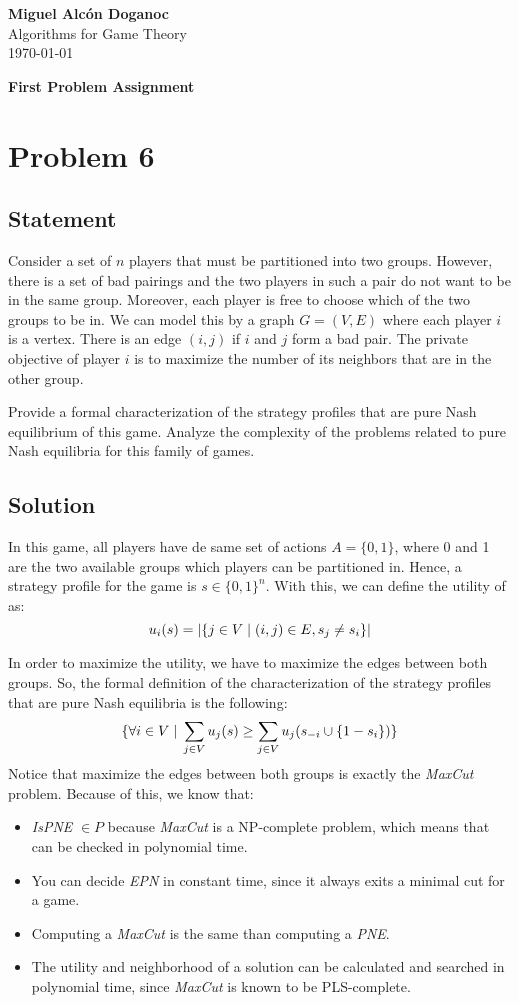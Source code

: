 \documentclass[a4paper, 11pt]{article}
\newcommand{\onemm}[0]{\hspace{1mm}}
\newcommand{\suchthat}[0]{\onemm|\onemm}
\begin{document}
\noindent
\begin{flushright}
    \large\textbf{Miguel Alcón Doganoc} \\
    Algorithms for Game Theory \\
    \today
\end{flushright}

\noindent
{\huge{\textbf{First Problem Assignment}}}

\section*{Problem 6}
{\color{statement}
\subsection*{Statement}
Consider a set of $n$ players that must be partitioned into two groups. However, there is a set of bad pairings and the two players in such a pair do not want to be in the same group. Moreover, each player is free to choose which of the two groups to be in. We can model this by a graph $G = (V, E)$ where each player $i$ is a vertex. There is an edge $(i, j)$ if $i$ and $j$ form a bad pair. The private objective of player $i$ is to maximize the number of its neighbors that are in the other group.

Provide a formal characterization of the strategy profiles that are pure Nash equilibrium of this game. Analyze the complexity of the problems related to pure Nash equilibria for this family of games.}
\subsection*{Solution}
In this game, all players have de same set of actions $A = \{0,1\}$, where 0 and 1 are the two available groups which players can be partitioned in. Hence, a strategy profile for the game is $s \in \{0,1\}^n$. With this, we can define the utility of as:
\[
    u_i(s) = |\{j \in V \suchthat (i,j) \in E, s_j \neq s_i\}|
\]

In order to maximize the utility, we have to maximize the edges between both groups. So, the formal definition of the characterization of the strategy profiles that are pure Nash equilibria is the following:
\[
    \{\forall i \in V \suchthat \sum_{j \in V} u_j(s) \geq \sum_{j \in V} u_j(s_{-i}\cup \{1-s_i\})\}
\]
Notice that maximize the edges between both groups is exactly the \textit{MaxCut} problem. Because of this, we know that:
\begin{itemize}
    \item \textit{IsPNE} $\in P$ because \textit{MaxCut} is a NP-complete problem, which means that can be checked in polynomial time.
    \item You can decide \textit{EPN} in constant time, since it always exits a minimal cut for a game.
    \item Computing a \textit{MaxCut} is the same than computing a \textit{PNE}.
    \item The utility and neighborhood of a solution can be calculated and searched in polynomial time, since \textit{MaxCut} is known to be PLS-complete.
\end{itemize}
\end{document}
